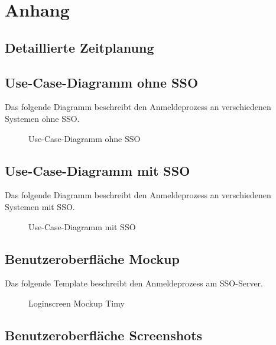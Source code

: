 \section{Anhang}
\subsection{Detaillierte Zeitplanung}
\label{app:Zeitplanung}





\clearpage

\subsection{Use-Case-Diagramm ohne SSO}
\label{app:Use-Case-Diagramm}
Das folgende Diagramm beschreibt den Anmeldeprozess an verschiedenen Systemen ohne \acs{SSO}.
\begin{figure}[htb]
\centering
{}
\caption{Use-Case-Diagramm ohne SSO}
\end{figure}
\clearpage

\subsection{Use-Case-Diagramm mit SSO}
\label{app:Use-Case-Diagramm2}
Das folgende Diagramm beschreibt den Anmeldeprozess an verschiedenen Systemen mit \acs{SSO}.
\begin{figure}[htb]
\centering
{}
\caption{Use-Case-Diagramm mit SSO}
\end{figure}
\clearpage

\subsection{Benutzeroberfläche Mockup}
\label{app:mockup}

Das folgende Template beschreibt den Anmeldeprozess am \acs{SSO}-Server.
\begin{figure}[htb]
\centering
{}
\caption{Loginscreen Mockup Timy}
\end{figure}
\clearpage

\subsection{Benutzeroberfläche Screenshots}
\label{app:screens}


